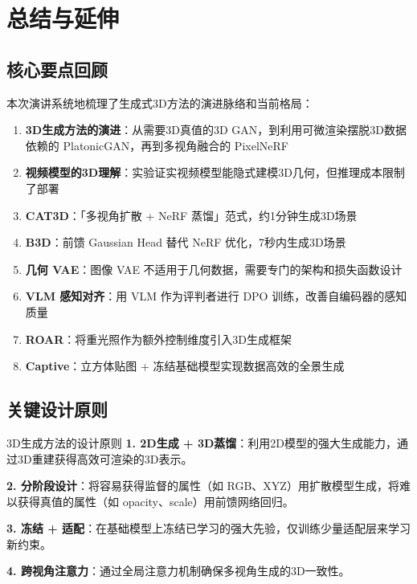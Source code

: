 \section{总结与延伸}

\subsection{核心要点回顾}

本次演讲系统地梳理了生成式3D方法的演进脉络和当前格局：

\begin{enumerate}
    \item \textbf{3D生成方法的演进}：从需要3D真值的3D GAN，到利用可微渲染摆脱3D数据依赖的 PlatonicGAN，再到多视角融合的 PixelNeRF
    \item \textbf{视频模型的3D理解}：实验证实视频模型能隐式建模3D几何，但推理成本限制了部署
    \item \textbf{CAT3D}：「多视角扩散 + NeRF 蒸馏」范式，约1分钟生成3D场景
    \item \textbf{B3D}：前馈 Gaussian Head 替代 NeRF 优化，7秒内生成3D场景
    \item \textbf{几何 VAE}：图像 VAE 不适用于几何数据，需要专门的架构和损失函数设计
    \item \textbf{VLM 感知对齐}：用 VLM 作为评判者进行 DPO 训练，改善自编码器的感知质量
    \item \textbf{ROAR}：将重光照作为额外控制维度引入3D生成框架
    \item \textbf{Captive}：立方体贴图 + 冻结基础模型实现数据高效的全景生成
\end{enumerate}

\subsection{关键设计原则}

\begin{importantbox}{3D生成方法的设计原则}
\textbf{1. 2D生成 + 3D蒸馏}：利用2D模型的强大生成能力，通过3D重建获得高效可渲染的3D表示。

\textbf{2. 分阶段设计}：将容易获得监督的属性（如 RGB、XYZ）用扩散模型生成，将难以获得真值的属性（如 opacity、scale）用前馈网络回归。

\textbf{3. 冻结 + 适配}：在基础模型上冻结已学习的强大先验，仅训练少量适配层来学习新约束。

\textbf{4. 跨视角注意力}：通过全局注意力机制确保多视角生成的3D一致性。
\end{importantbox}

